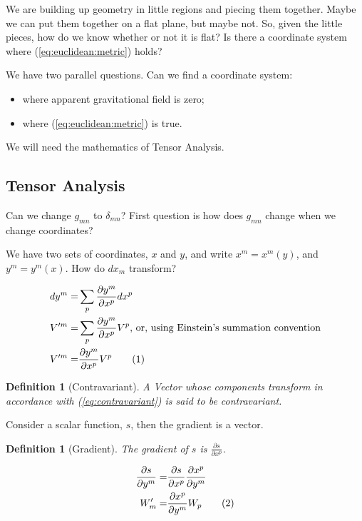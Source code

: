 \documentclass[]{article}
\newcommand\numberthis{\addtocounter{equation}{1}\tag{\theequation}}
\newtheorem{defn}[thm]{Definition}
\begin{document}
We are building up geometry in little regions and piecing them together. Maybe we can put them together on a flat plane, but maybe not. So, given the little pieces, how do we know whether or not it is flat? Is there a coordinate system where (\ref{eq:euclidean:metric}) holds?

We have two parallel questions. Can we find a coordinate system:
\begin{itemize}
	\item where apparent gravitational field is zero;
	\item where (\ref{eq:euclidean:metric}) is true.
\end{itemize}

We will need the mathematics of Tensor Analysis.

\subsection{Tensor Analysis}

Can we change $g_{mn}$ to $\delta_{mn}$? First question is how does $g_{mn}$ change when we change coordinates?

We have two sets of coordinates, $x$ and $y$, and write $x^m = x^m(y)$, and $y^m = y^m(x)$. How do $dx_m$ transform?

\begin{align*}
	dy^m =& \sum_p \frac{\partial y^m}{\partial x^p} dx^p\\
	V^{\prime m} =& \sum_p \frac{\partial y^m}{\partial x^p} V^p \text{, or, using Einstein's summation convention} \\
	V^{\prime m} =&  \frac{\partial y^m}{\partial x^p} V^p \numberthis \label{eq:contravariant}
\end{align*}

\begin{defn}[Contravariant]
	A Vector whose components transform in accordance with (\ref{eq:contravariant}) is said to be \emph{contravariant}.
\end{defn}

Consider a scalar function, $s$, then the gradient is a vector.

\begin{defn}[Gradient]
	The gradient of $s$ is $\frac{\partial s}{\partial x^p}$.
\end{defn}

\begin{align*}
	\frac{\partial s}{\partial y^m} =& \frac{\partial s}{\partial x^p}\frac{\partial x^p}{\partial y^m}\\
	W_m^\prime =& \frac{\partial x^p}{\partial y^m} W_p \numberthis \label{eq:covariant}
\end{align*}
\end{document}
